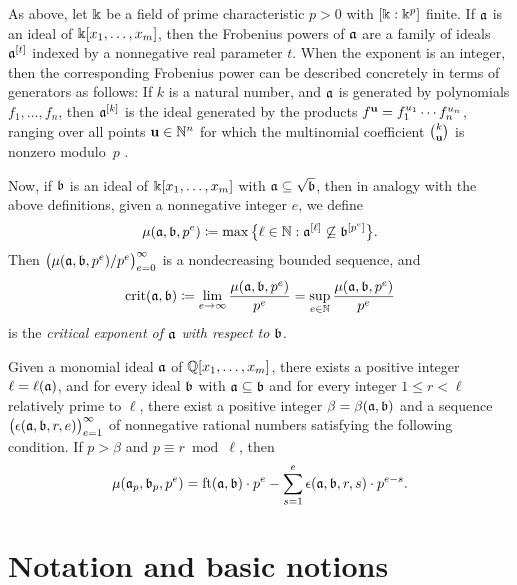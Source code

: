 \documentclass{amsart}
\begin{document}
As above, let $\Bbbk$ be a field of prime characteristic $p>0$ with $[\Bbbk: \Bbbk^p]$ finite.
If $\mathfrak{a}$ is an ideal of $\Bbbk[x_1, \ldots, x_m]$, then the Frobenius powers of $\mathfrak{a}$ are a family of ideals $\mathfrak{a}^{[t]}$ indexed by a nonnegative real parameter $t$.
When the exponent is an integer, then the corresponding Frobenius power can be described concretely in terms of generators as follows:
If $k$ is a natural number, and $\mathfrak{a}$ is generated by polynomials $f_1, \ldots, f_n$, then $\mathfrak{a}^{[k]}$ is the ideal generated by the products $f^{\mathbf{u}} = f_1^{u_1}\cdots f_n^{u_n}$, ranging over all points $\mathbf{u} \in \mathbb{N}^n$ for which the multinomial coefficient $\binom{k}{\mathbf{u}}$ is nonzero modulo~$p$  \cite[Proposition~3.5]{hernandez+etal.frobenius_powers}.

Now, if $\mathfrak{b}$ is an ideal of $\Bbbk[x_1, \ldots, x_m]$ with $\mathfrak{a} \subseteq \sqrt{\mathfrak{b}}$, then in analogy with the above definitions, given a nonnegative integer $e$, we define
\[\mu(\mathfrak{a},\mathfrak{b},p^e) \coloneqq \max\big\{\ell\in \mathbb{N} : \mathfrak{a}^{[\ell]} \not\subseteq \mathfrak{b}^{[p^e]}\big\}.\]
Then $\big(\mu(\mathfrak{a},\mathfrak{b},p^e)/p^e\big)_{e=0}^{\infty}$ is a nondecreasing bounded sequence, and
\begin{equation}\label{eq: crit as a limit of mus}
   \operatorname{crit}(\mathfrak{a},\mathfrak{b}) \coloneqq \lim_{e\to \infty} \frac{\mu(\mathfrak{a},\mathfrak{b},p^e)}{p^e} = \sup_{e\in \mathbb{N}} \frac{\mu(\mathfrak{a},\mathfrak{b},p^e)}{p^e}
\end{equation}
is the \emph{critical exponent of $\mathfrak{a}$ with respect to $\mathfrak{b}$}.

\begin{theorem}
   \label{general-mu-theorem: T}
   Given a monomial ideal $\mathfrak{a}$ of $\mathbb{Q}[x_1, \ldots, x_m]$, there exists a positive integer $\ell = \ell(\mathfrak{a})$, and for every ideal $\mathfrak{b}$ with $\mathfrak{a} \subseteq {\mathfrak{b}}$ and for every integer $1 \leq r < \ell$ relatively prime to $\ell$, there exist a positive integer $\beta = \beta(\mathfrak{a}, \mathfrak{b})$ and a sequence $\big(\epsilon(\mathfrak{a}, \mathfrak{b}, r, e)\big)_{e=1}^{\infty}$ of nonnegative rational numbers satisfying the following condition.
   If $p > \beta$ and $p \equiv r \bmod \ell$, then
   \[ \mu(\mathfrak{a}_p, \mathfrak{b}_p, p^e) = \operatorname{ft}(\mathfrak{a}, \mathfrak{b}) \cdot p^e - \sum_{s=1}^{e} \epsilon(\mathfrak{a}, \mathfrak{b}, r, s) \cdot p^{e-s}.\]
\end{theorem}

\section{Notation and basic notions}
\end{document}
